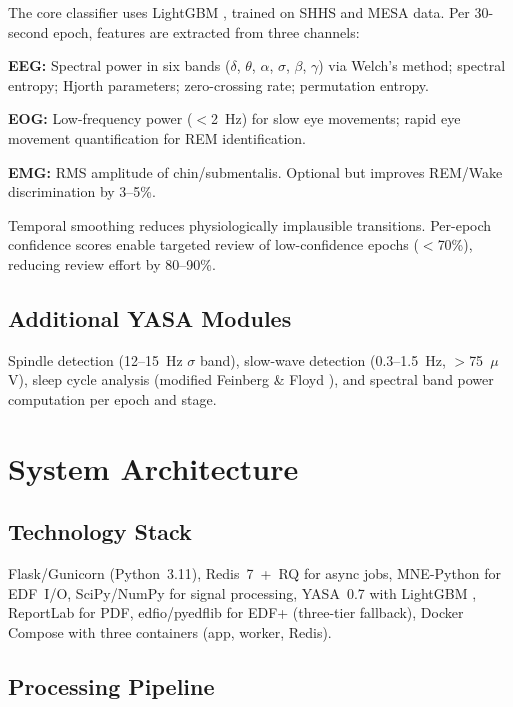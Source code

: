 \documentclass[11pt,a4paper,twocolumn]{article}
\begin{document}
The core classifier uses LightGBM \cite{lightgbm}, trained on SHHS and MESA data. Per 30-second epoch, features are extracted from three channels:

\textbf{EEG:} Spectral power in six bands ($\delta$, $\theta$, $\alpha$, $\sigma$, $\beta$, $\gamma$) via Welch's method; spectral entropy; Hjorth parameters; zero-crossing rate; permutation entropy.

\textbf{EOG:} Low-frequency power ($<$2~Hz) for slow eye movements; rapid eye movement quantification for REM identification.

\textbf{EMG:} RMS amplitude of chin/submentalis. Optional but improves REM/Wake discrimination by 3--5\%.

Temporal smoothing reduces physiologically implausible transitions. Per-epoch confidence scores enable targeted review of low-confidence epochs ($<$70\%), reducing review effort by 80--90\%.

\subsection{Additional YASA Modules}

Spindle detection (12--15~Hz $\sigma$ band), slow-wave detection (0.3--1.5~Hz, $>$75~$\mu$V), sleep cycle analysis (modified Feinberg \& Floyd \cite{feinberg1979}), and spectral band power computation per epoch and stage.


\section{System Architecture}

\subsection{Technology Stack}

Flask/Gunicorn (Python~3.11), Redis~7~+~RQ for async jobs, MNE-Python \cite{gramfort2014} for EDF~I/O, SciPy/NumPy for signal processing, YASA~0.7 \cite{vallat2021} with LightGBM \cite{lightgbm}, ReportLab for PDF, edfio/pyedflib for EDF+ (three-tier fallback), Docker Compose with three containers (app, worker, Redis).

\subsection{Processing Pipeline}
\end{document}
